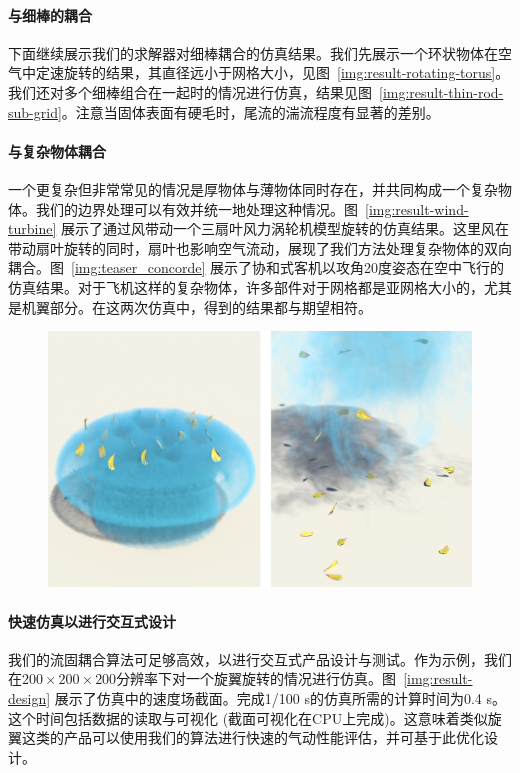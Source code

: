 \paragraph{与细棒的耦合}
下面继续展示我们的求解器对细棒耦合的仿真结果。我们先展示一个环状物体在空气中定速旋转的结果，其直径远小于网格大小，见图~\ref{img:result-rotating-torus}。我们还对多个细棒组合在一起时的情况进行仿真，结果见图~\ref{img:result-thin-rod-sub-grid}。注意当固体表面有硬毛时，尾流的湍流程度有显著的差别。

\paragraph{与复杂物体耦合}
一个更复杂但非常常见的情况是厚物体与薄物体同时存在，并共同构成一个复杂物体。我们的边界处理可以有效并统一地处理这种情况。图~\ref{img:result-wind-turbine} 展示了通过风带动一个三扇叶风力涡轮机模型旋转的仿真结果。这里风在带动扇叶旋转的同时，扇叶也影响空气流动，展现了我们方法处理复杂物体的双向耦合。图~\ref{img:teaser_concorde} 展示了协和式客机以攻角20度姿态在空中飞行的仿真结果。对于飞机这样的复杂物体，许多部件对于网格都是亚网格大小的，尤其是机翼部分。在这两次仿真中，得到的结果都与期望相符。

\begin{figure}[htb]
  \centering
    \includegraphics[width=0.99\columnwidth]{figures/result_blowing_leaves.png}
  \label{img:result-blowing-leaves}
\end{figure}

\paragraph{快速仿真以进行交互式设计}
我们的流固耦合算法可足够高效，以进行交互式产品设计与测试。作为示例，我们在$200\!\times\!200\!\times\!200$分辨率下对一个旋翼旋转的情况进行仿真。图~\ref{img:result-design} 展示了仿真中的速度场截面。完成1/100 s的仿真所需的计算时间为0.4 s。这个时间包括数据的读取与可视化 (截面可视化在CPU上完成)。这意味着类似旋翼这类的产品可以使用我们的算法进行快速的气动性能评估，并可基于此优化设计。

